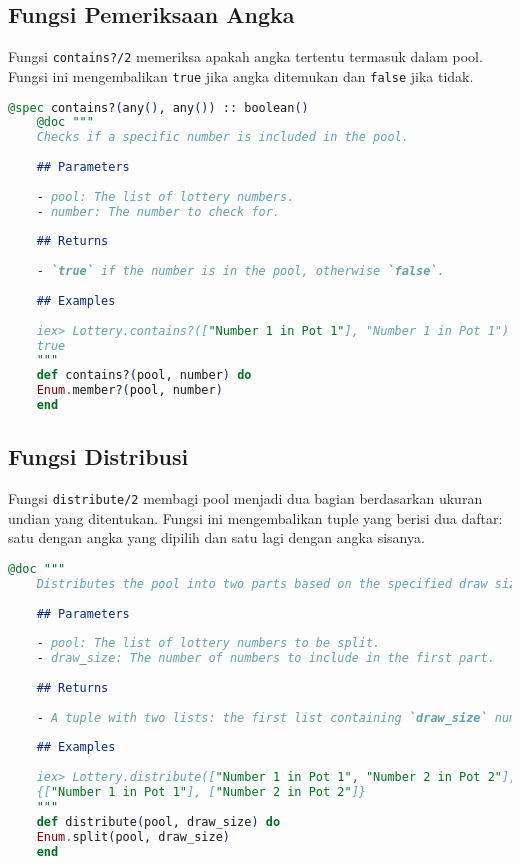 \subsection{Fungsi Pemeriksaan Angka}

Fungsi \texttt{contains?/2} memeriksa apakah angka tertentu termasuk dalam pool. Fungsi ini mengembalikan \texttt{true} jika angka ditemukan dan \texttt{false} jika tidak.

\begin{lstlisting}[language=elixir, caption={Fungsi Pemeriksaan Angka}]
	@spec contains?(any(), any()) :: boolean()
	@doc """
	Checks if a specific number is included in the pool.
	
	## Parameters
	
	- pool: The list of lottery numbers.
	- number: The number to check for.
	
	## Returns
	
	- `true` if the number is in the pool, otherwise `false`.
	
	## Examples
	
	iex> Lottery.contains?(["Number 1 in Pot 1"], "Number 1 in Pot 1")
	true
	"""
	def contains?(pool, number) do
	Enum.member?(pool, number)
	end
\end{lstlisting}

\subsection{Fungsi Distribusi}

Fungsi \texttt{distribute/2} membagi pool menjadi dua bagian berdasarkan ukuran undian yang ditentukan. Fungsi ini mengembalikan tuple yang berisi dua daftar: satu dengan angka yang dipilih dan satu lagi dengan angka sisanya.

\begin{lstlisting}[language=elixir, caption={Fungsi Distribusi}]
	@doc """
	Distributes the pool into two parts based on the specified draw size.
	
	## Parameters
	
	- pool: The list of lottery numbers to be split.
	- draw_size: The number of numbers to include in the first part.
	
	## Returns
	
	- A tuple with two lists: the first list containing `draw_size` numbers, and the second list containing the remaining numbers.
	
	## Examples
	
	iex> Lottery.distribute(["Number 1 in Pot 1", "Number 2 in Pot 2"], 1)
	{["Number 1 in Pot 1"], ["Number 2 in Pot 2"]}
	"""
	def distribute(pool, draw_size) do
	Enum.split(pool, draw_size)
	end
\end{lstlisting}


